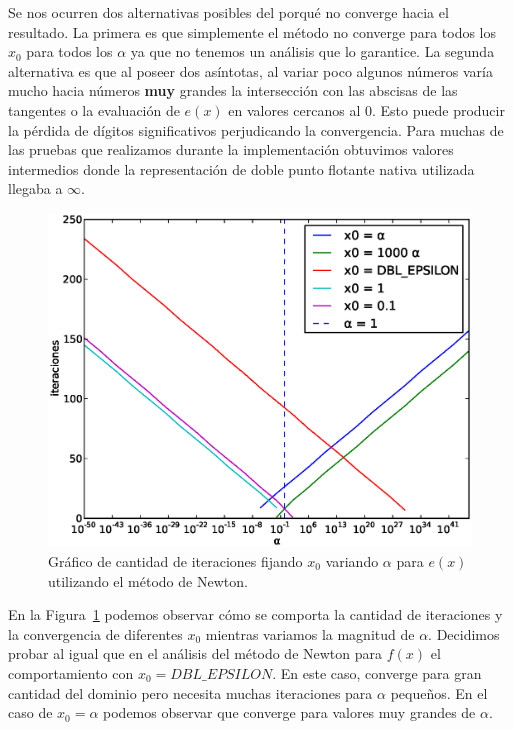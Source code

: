 Se nos ocurren dos alternativas posibles del porqué no converge hacia el
resultado. La primera es que simplemente el método no converge para todos los
$x_0$ para todos los $\alpha$ ya que no tenemos un análisis que lo garantice.
La segunda alternativa es que al poseer dos asíntotas, al variar poco algunos
números varía mucho hacia números \textbf{muy} grandes la intersección con las
abscisas de las tangentes o la evaluación de $e(x)$ en valores cercanos al $0$.
Esto puede producir la pérdida de dígitos significativos perjudicando la
convergencia. Para muchas de las pruebas que realizamos durante la
implementación obtuvimos valores intermedios donde la representación de doble
punto flotante nativa utilizada llegaba a $\infty$.

\begin{figure}[!htbp]
  \begin{center}
    \includegraphics[scale=0.5]{graficos/new/e_newton_x0_fijo.eps}
    \caption{\label{fig:e_newton_x0_fijo} Gráfico de cantidad de iteraciones fijando $x_0$ variando $\alpha$ para $e(x)$ utilizando el método de Newton.}
  \end{center}
\end{figure}

En la Figura~\ref{fig:e_newton_x0_fijo} podemos observar cómo se comporta la
cantidad de iteraciones y la convergencia de diferentes $x_0$ mientras variamos
la magnitud de $\alpha$. Decidimos probar al igual que en el análisis del
método de Newton para $f(x)$ el comportamiento con $x_0 =
\textit{DBL\_EPSILON}$. En este caso, converge para gran cantidad del dominio
pero necesita muchas iteraciones para $\alpha$ pequeños. En el caso de $x_0 =
\alpha$ podemos observar que converge para valores muy grandes de $\alpha$.\\

